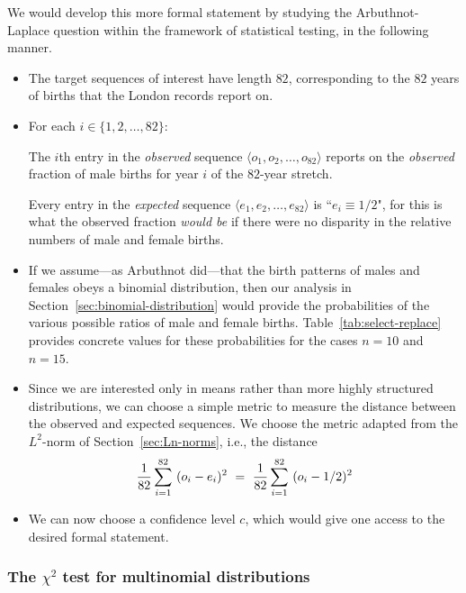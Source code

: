 \noindent
We would develop this more formal statement by studying the Arbuthnot-Laplace question within the framework of statistical testing, in the following manner.
\begin{itemize}
\item
The target sequences of interest have length $82$, corresponding to the $82$ years of births that the London records report on. 
\medskip\item
For each $i \in \{1,2, \ldots, 82\}$:

\smallskip

The $i$th entry in the {\em observed} sequence $\langle o_1, o_2, \ldots, o_{82} \rangle$ reports on the {\em observed} fraction of male births for year $i$ of the $82$-year stretch.

\smallskip

Every entry in the {\em expected} sequence $\langle e_1, e_2, \ldots, e_{82} \rangle$ is ``$e_i \equiv 1/2$", for this is what the observed fraction {\em would be} if there were no disparity in the relative numbers of male and female births.

\medskip\item
If we assume---as Arbuthnot did---that the birth patterns of males and females obeys a binomial distribution, then our analysis in Section~\ref{sec:binomial-distribution} would provide the probabilities of the various possible ratios of male and female births.  Table~\ref{tab:select-replace} provides concrete values for these probabilities for the cases $n=10$ and $n=15$.

\medskip\item
Since we are interested only in means rather than more highly structured distributions, we can choose a simple metric to measure the distance between the observed and expected sequences.  We choose the metric adapted from the $L^2$-norm of Section~\ref{sec:Ln-norms}, i.e., the distance
\[ {1 \over 82} \sum_{i=1}^{82} \ (o_i -e_i)^2 \ = \ {1 \over 82} \sum_{i=1}^{82} \ (o_i - 1/2)^2 \]

\medskip\item
We can now choose a confidence level $c$, which would give one access to the desired formal statement.
\end{itemize}

\subsubsection{The $\chi^2$ test for multinomial distributions}

